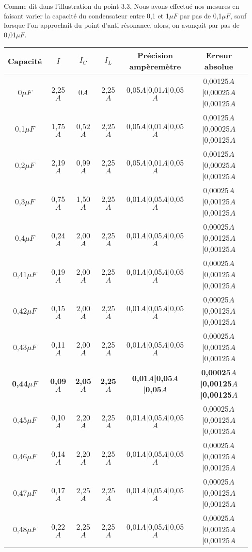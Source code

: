 \documentclass{report}
\begin{document}
\hspace*{0,5cm} Comme dit dans l'illustration du point 3.3, Nous avons effectu\'e nos mesures en faisant varier la capacit\'e du condensateur entre 0,1 et 1$\mu F$ par pas de 0,1$\mu F$, sauf lorsque l'on approchait du point d'anti-r\'esonance, alors, on avan\c cait par pas de 0,01$\mu F$. \\

\begin{tabular}{|c|c|c|c|c|c|}
\hline
\textbf{Capacit\'e} & \textbf{$I$} & \textbf{$I_C$} & \textbf{$I_L$} & \textbf{Pr\'ecision amp\`erem\`etre} & \textbf{Erreur absolue} \\
\hline
0$\mu F$ & 2,25$A$ & 0$A$ & 2,25$A$ & 0,05$A$|0,01$A$|0,05$A$ & 0,00125$A$|0,00025$A$|0,00125$A$ \\
\hline
0,1$\mu F$ & 1,75$A$ & 0,52$A$ & 2,25$A$ & 0,05$A$|0,01$A$|0,05$A$ & 0,00125$A$|0,00025$A$|0,00125$A$ \\
\hline
0,2$\mu F$ & 2,19$A$ & 0,99$A$ & 2,25$A$ & 0,05$A$|0,01$A$|0,05$A$ & 0,00125$A$|0,00025$A$|0,00125$A$ \\
\hline
0,3$\mu F$ & 0,75$A$ & 1,50$A$ & 2,25$A$ & 0,01$A$|0,05$A$|0,05$A$ & 0,00025$A$|0,00125$A$|0,00125$A$ \\
\hline
0,4$\mu F$ & 0,24$A$ & 2,00$A$ & 2,25$A$ & 0,01$A$|0,05$A$|0,05$A$ & 0,00025$A$|0,00125$A$|0,00125$A$ \\
\hline
0,41$\mu F$ & 0,19$A$ & 2,00$A$ & 2,25$A$ & 0,01$A$|0,05$A$|0,05$A$ & 0,00025$A$|0,00125$A$|0,00125$A$ \\
\hline
0,42$\mu F$ & 0,15$A$ & 2,00$A$ & 2,25$A$ & 0,01$A$|0,05$A$|0,05$A$ & 0,00025$A$|0,00125$A$|0,00125$A$ \\
\hline
0,43$\mu F$ & 0,11$A$ & 2,00$A$ & 2,25$A$ & 0,01$A$|0,05$A$|0,05$A$ & 0,00025$A$|0,00125$A$|0,00125$A$ \\
\hline
\textbf{0,44$\mu F$} & \textbf{0,09$A$} &\textbf{ 2,05$A$} & \textbf{2,25$A$} & \textbf{0,01$A$|0,05$A$|0,05$A$} & \textbf{0,00025$A$|0,00125$A$|0,00125$A$} \\
\hline
0,45$\mu F$ & 0,10$A$ & 2,20$A$ & 2,25$A$ & 0,01$A$|0,05$A$|0,05$A$ & 0,00025$A$|0,00125$A$|0,00125$A$ \\
\hline
0,46$\mu F$ & 0,14$A$ & 2,20$A$ & 2,25$A$ & 0,01$A$|0,05$A$|0,05$A$ & 0,00025$A$|0,00125$A$|0,00125$A$ \\
\hline
0,47$\mu F$ & 0,17$A$ & 2,25$A$ & 2,25$A$ & 0,01$A$|0,05$A$|0,05$A$ & 0,00025$A$|0,00125$A$|0,00125$A$ \\
\hline
0,48$\mu F$ & 0,22$A$ & 2,25$A$ & 2,25$A$ & 0,01$A$|0,05$A$|0,05$A$ & 0,00025$A$|0,00125$A$|0,00125$A$ \\

\end{tabular}
\end{document}

